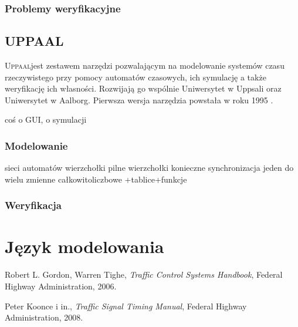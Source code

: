 \documentclass{pracamgr}
\newcommand{\upp}{\textsc{Uppaal}}
\theoremstyle{plain}
\begin{document}
\subsection{Problemy weryfikacyjne}

\section{UPPAAL}

\upp jest zestawem narzędzi pozwalającym na modelowanie systemów czasu
rzeczywistego przy pomocy automatów czasowych, ich symulację a także
weryfikację ich własności. Rozwijają go wspólnie Uniwersytet w Uppsali
oraz Uniwersytet w Aalborg. Pierwsza wersja narzędzia powstała w roku
1995 \cite{UPPAAL95}.

coś o GUI, o symulacji

\subsection{Modelowanie}

sieci automatów
wierzchołki pilne
wierzchołki konieczne
synchronizacja jeden do wielu
zmienne całkowitoliczbowe +tablice+funkcje

\subsection{Weryfikacja}



\chapter{Język modelowania}


\begin{thebibliography}{99}

 Robert L. Gordon, Warren Tighe,
\textit{Traffic Control Systems Handbook}, Federal Highway
Administration, 2006.

 Peter Koonce i in., \textit{Traffic Signal
  Timing Manual}, Federal Highway Administration, 2008.

\end{thebibliography}
\end{document}
